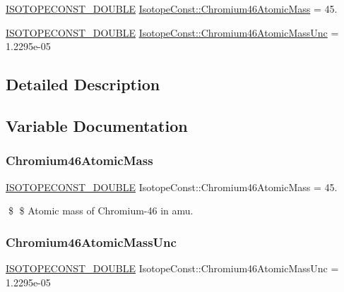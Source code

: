 \begin{DoxyCompactItemize}
\item 
\mbox{\hyperlink{group___isotope_const-_macros_ga8f45a7272ce02c0b4c65c44636ed719a}{I\+S\+O\+T\+O\+P\+E\+C\+O\+N\+S\+T\+\_\+\+D\+O\+U\+B\+LE}} \mbox{\hyperlink{group___isotope_const-_chromium-_cr46_gadd6f917c9f6b825da7001a1cfd0708ac}{Isotope\+Const\+::\+Chromium46\+Atomic\+Mass}} = 45.
\item 
\mbox{\hyperlink{group___isotope_const-_macros_ga8f45a7272ce02c0b4c65c44636ed719a}{I\+S\+O\+T\+O\+P\+E\+C\+O\+N\+S\+T\+\_\+\+D\+O\+U\+B\+LE}} \mbox{\hyperlink{group___isotope_const-_chromium-_cr46_ga24d840fb686fd5028dd208bef8c4614e}{Isotope\+Const\+::\+Chromium46\+Atomic\+Mass\+Unc}} = 1.\+2295e-\/05
\end{DoxyCompactItemize}


\subsection{Detailed Description}


\subsection{Variable Documentation}
\mbox{\label{group___isotope_const-_chromium-_cr46_gadd6f917c9f6b825da7001a1cfd0708ac}} 
\subsubsection{\texorpdfstring{Chromium46\+Atomic\+Mass}{Chromium46AtomicMass}}
{\footnotesize\ttfamily \mbox{\hyperlink{group___isotope_const-_macros_ga8f45a7272ce02c0b4c65c44636ed719a}{I\+S\+O\+T\+O\+P\+E\+C\+O\+N\+S\+T\+\_\+\+D\+O\+U\+B\+LE}} Isotope\+Const\+::\+Chromium46\+Atomic\+Mass = 45.}

\$ \$ Atomic mass of Chromium-\/46 in amu. \mbox{\label{group___isotope_const-_chromium-_cr46_ga24d840fb686fd5028dd208bef8c4614e}} 
\subsubsection{\texorpdfstring{Chromium46\+Atomic\+Mass\+Unc}{Chromium46AtomicMassUnc}}
{\footnotesize\ttfamily \mbox{\hyperlink{group___isotope_const-_macros_ga8f45a7272ce02c0b4c65c44636ed719a}{I\+S\+O\+T\+O\+P\+E\+C\+O\+N\+S\+T\+\_\+\+D\+O\+U\+B\+LE}} Isotope\+Const\+::\+Chromium46\+Atomic\+Mass\+Unc = 1.\+2295e-\/05}

